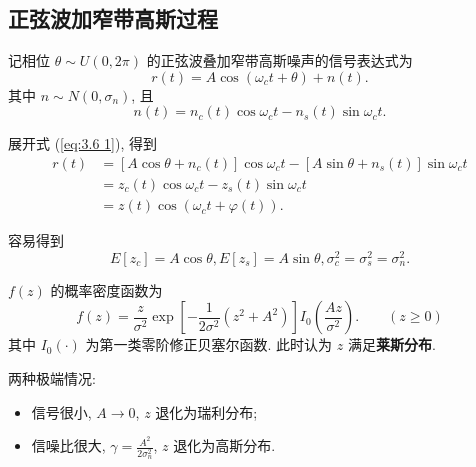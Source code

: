 \subsection{正弦波加窄带高斯过程}
记相位 $\theta\sim U(0,2\pi)$ 的正弦波叠加窄带高斯噪声的信号表达式为
\begin{equation} \label{eq:3.6 1}
    r(t)=A\cos(\omega_ct+\theta)+n(t).
\end{equation}
其中 $n\sim N(0,\sigma_n)$, 且
\begin{equation}
    n(t)=n_c(t)\cos\omega_ct-n_s(t)\sin\omega_ct.
\end{equation}

展开式 (\ref{eq:3.6 1}), 得到
\begin{equation}
    \begin{aligned}
        r(t) & =[A\cos\theta+n_c(t)]\cos\omega_ct-[A\sin\theta+n_s(t)]\sin\omega_ct \\
             & =z_c(t)\cos\omega_ct-z_s(t)\sin\omega_ct                             \\
             & =z(t)\cos(\omega_ct+\varphi(t)).
    \end{aligned}
\end{equation}

容易得到
\begin{equation*}
    E[z_c]=A\cos\theta, E[z_s]=A\sin\theta, \sigma_c^2=\sigma_s^2=\sigma_n^2.
\end{equation*}

$f(z)$ 的概率密度函数为
\begin{equation}
    f(z)=\frac{z}{\sigma^2}\exp\left[-\frac{1}{2\sigma^2}(z^2+A^2)\right]I_0\left(\frac{Az}{\sigma^2}\right). \qquad (z\geq 0)
\end{equation}
其中 $I_0(\cdot)$ 为第一类零阶修正贝塞尔函数. 此时认为 $z$ 满足\textbf{莱斯分布}.

两种极端情况:
\begin{itemize}
    \item 信号很小, $A\rightarrow0$, $z$ 退化为瑞利分布;
    \item 信噪比很大, $\displaystyle\gamma=\frac{A^2}{2\sigma_n^2}$, $z$ 退化为高斯分布.
\end{itemize}
